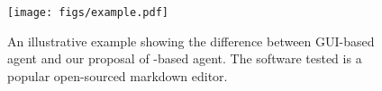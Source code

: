 \begin{figure}[h]
    \centering
    \texttt{[image: figs/example.pdf]}
    \caption{An illustrative example showing the difference between GUI-based agent and our proposal of \sys-based agent. The software tested is a popular open-sourced markdown editor.}
    \label{fig:example}
\end{figure}